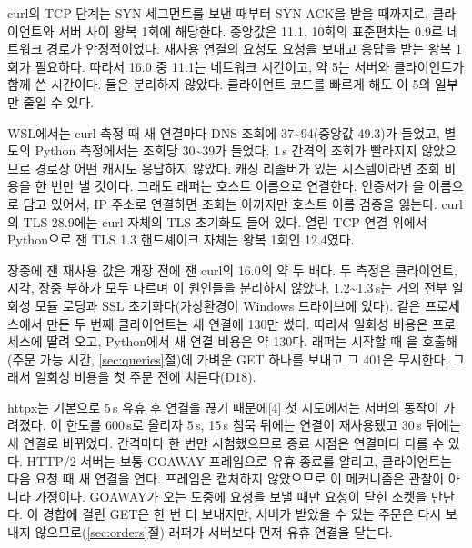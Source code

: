  curl의 TCP 단계는 SYN 세그먼트를 보낸 때부터 SYN-ACK을 받을 때까지로, 클라이언트와 서버 사이 왕복 1회에 해당한다. 중앙값은 11.1\ms{}, 10회의 표준편차는 0.9\ms{}로 네트워크 경로가 안정적이었다. 재사용 연결의 요청도 요청을 보내고 응답을 받는 왕복 1회가 필요하다. 따라서 16.0\ms{} 중 11.1\ms{}는 네트워크 시간이고, 약 5\ms{}는 서버와 클라이언트가 함께 쓴 시간이다. 둘은 분리하지 않았다. 클라이언트 코드를 빠르게 해도 이 5\ms{}의 일부만 줄일 수 있다.

 WSL에서는 curl 측정 때 새 연결마다 DNS 조회에 37\textasciitilde 94\ms{}(중앙값 49.3\ms)가 들었고, 별도의 Python 측정에서는 조회당 30\textasciitilde 39\ms{}가 들었다. 1\,s 간격의 조회가 빨라지지 않았으므로 경로상 어떤 캐시도 응답하지 않았다. 캐싱 리졸버가 있는 시스템이라면 조회 비용을 한 번만 낼 것이다. 그래도 래퍼는 호스트 이름으로 연결한다. 인증서가 을 이름으로 담고 있어서, IP 주소로 연결하면 조회는 아끼지만 호스트 이름 검증을 잃는다. curl의 TLS 28.9\ms{}에는 curl 자체의 TLS 초기화도 들어 있다. 열린 TCP 연결 위에서 Python으로 잰 TLS 1.3 핸드셰이크 자체는 왕복 1회인 12.4\ms{}였다.

 장중에 잰 재사용 값은 개장 전에 잰 curl의 16.0\ms{}의 약 두 배다. 두 측정은 클라이언트, 시각, 장중 부하가 모두 다르며 이 원인들을 분리하지 않았다. 1.2\textasciitilde 1.3\,s는 거의 전부 일회성 모듈 로딩과 SSL 초기화다(가상환경이 Windows 드라이브에 있다). 같은 프로세스에서 만든 두 번째 클라이언트는 새 연결에 130\ms{}만 썼다. 따라서 일회성 비용은 프로세스에 딸려 오고, Python에서 새 연결 비용은 약 130\ms{}다. 래퍼는 시작할 때 을 호출해 (주문 가능 시간, \ref{sec:queries}절)에 가벼운 GET 하나를 보내고 그 401은 무시한다. 그래서 일회성 비용을 첫 주문 전에 치른다(D18).

 httpx는 기본으로 5\,s 유휴 후 연결을 끊기 때문에[4] 첫 시도에서는 서버의 동작이 가려졌다. 이 한도를 600\,s로 올리자 5\,s, 15\,s 침묵 뒤에는 연결이 재사용됐고 30\,s 뒤에는 새 연결로 바뀌었다. 간격마다 한 번만 시험했으므로 종료 시점은 연결마다 다를 수 있다. HTTP/2 서버는 보통 GOAWAY 프레임으로 유휴 종료를 알리고, 클라이언트는 다음 요청 때 새 연결을 연다. 프레임은 캡처하지 않았으므로 이 메커니즘은 관찰이 아니라 가정이다. GOAWAY가 오는 도중에 요청을 보낼 때만 요청이 닫힌 소켓을 만난다. 이 경합에 걸린 GET은 한 번 더 보내지만, 서버가 받았을 수 있는 주문은 다시 보내지 않으므로(\ref{sec:orders}절) 래퍼가 서버보다 먼저 유휴 연결을 닫는다.

